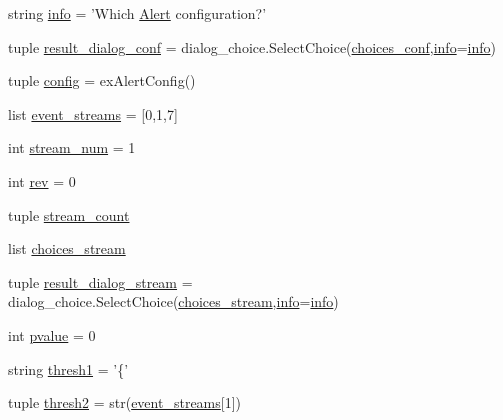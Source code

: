 \begin{DoxyCompactItemize}
\item 
string \hyperlink{namespacerun__archival__gui_ad1643ab4eafe2c9327907387e49d1763}{info} = 'Which \hyperlink{classamonpy_1_1dbase_1_1db__classes_1_1_alert}{Alert} configuration?'
\item 
tuple \hyperlink{namespacerun__archival__gui_aee5d9d725a2d81626f709acca7420a84}{result\-\_\-dialog\-\_\-conf} = dialog\-\_\-choice.\-Select\-Choice(\hyperlink{namespacerun__archival__gui_aa423912994ac1bddf7fcb25b590089d5}{choices\-\_\-conf},\hyperlink{namespacerun__archival__gui_ad1643ab4eafe2c9327907387e49d1763}{info}=\hyperlink{namespacerun__archival__gui_ad1643ab4eafe2c9327907387e49d1763}{info})
\item 
tuple \hyperlink{namespacerun__archival__gui_a1d8fd345205ef225bd22809ef7491177}{config} = ex\-Alert\-Config()
\item 
list \hyperlink{namespacerun__archival__gui_a663b3af69401dfd54271cd973d0bb968}{event\-\_\-streams} = \mbox{[}0,1,7\mbox{]}
\item 
int \hyperlink{namespacerun__archival__gui_a62873170b28c127df5a067091c237022}{stream\-\_\-num} = 1
\item 
int \hyperlink{namespacerun__archival__gui_a7a0000484d87d296a359fc208834f58b}{rev} = 0
\item 
tuple \hyperlink{namespacerun__archival__gui_a0b79d0287b0d0657f1aa1af18063c1e1}{stream\-\_\-count}
\item 
list \hyperlink{namespacerun__archival__gui_ae5a341b12805f049c64adaa23e98c3ab}{choices\-\_\-stream}
\item 
tuple \hyperlink{namespacerun__archival__gui_ab6fdfba3d0c721228ed99b51992b59af}{result\-\_\-dialog\-\_\-stream} = dialog\-\_\-choice.\-Select\-Choice(\hyperlink{namespacerun__archival__gui_ae5a341b12805f049c64adaa23e98c3ab}{choices\-\_\-stream},\hyperlink{namespacerun__archival__gui_ad1643ab4eafe2c9327907387e49d1763}{info}=\hyperlink{namespacerun__archival__gui_ad1643ab4eafe2c9327907387e49d1763}{info})
\item 
int \hyperlink{namespacerun__archival__gui_a3316510dcd59d172ae55c2f37998d130}{pvalue} = 0
\item 
string \hyperlink{namespacerun__archival__gui_ab8a2a553c59d2c9c0bd81a138341bdbd}{thresh1} = '\{'
\item 
tuple \hyperlink{namespacerun__archival__gui_a9c3d13b4619e84a8e7a69c1f8586a6bc}{thresh2} = str(\hyperlink{namespacerun__archival__gui_a663b3af69401dfd54271cd973d0bb968}{event\-\_\-streams}\mbox{[}1\mbox{]})
\item 

\end{DoxyCompactItemize}
